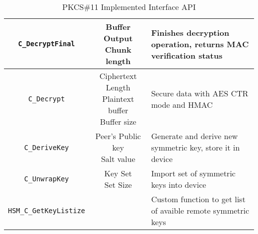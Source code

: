 \begin{table}[]
\begin{tabular}{|c|c|l|}
	\texttt{C\_DecryptFinal}	& \makecell{Buffer\\Output Chunk length} & Finishes decryption operation, returns MAC verification status\\ \hline
	\texttt{C\_Decrypt}		& \makecell{Ciphertext\\Length\\Plaintext buffer\\Buffer size} & Secure data with AES CTR mode and HMAC\\ \hline
	\texttt{C\_DeriveKey}		& \makecell{Peer's Public key\\Salt value} & Generate and derive new symmetric key, store it in device \\ \hline
	\texttt{C\_UnwrapKey}		& \makecell{Key Set\\Set Size} & Import set of symmetric keys into device\\ \hline
	\texttt{HSM\_C\_GetKeyListize}	& & Custom function to get list of avaible remote symmetric keys\\ \hline
\end{tabular}
\caption{PKCS\#11 Implemented Interface API}
\label{tab:pkcs11-api}
\end{table}
